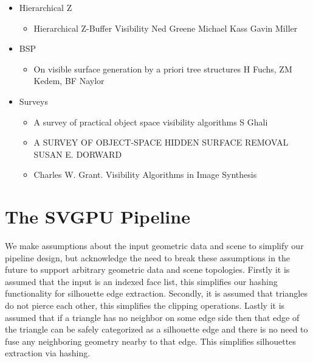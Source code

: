 \documentclass[review]{acmsiggraph}
\begin{document}
\begin{itemize}
\item Hierarchical Z
\begin{itemize}
\item Hierarchical Z-Buffer Visibility Ned Greene Michael Kass Gavin Miller
\end{itemize}
\item BSP
\begin{itemize}
\item On visible surface generation by a priori tree structures H Fuchs, ZM Kedem, BF Naylor
\end{itemize}
\item Surveys
\begin{itemize}
\item A survey of practical object space visibility algorithms  S Ghali
\item A SURVEY OF OBJECT-SPACE HIDDEN SURFACE REMOVAL SUSAN E. DORWARD
\item Charles W. Grant. Visibility Algorithms in Image Synthesis
\end{itemize}
\end{itemize}

\section{The SVGPU Pipeline}

We make assumptions about the input geometric data and scene to simplify our pipeline design, but acknowledge the need to break these assumptions in the future to support arbitrary geometric data and scene topologies. Firstly it is assumed that the input is an indexed face list, this simplifies our hashing functionality for silhouette edge extraction. Secondly, it is assumed that triangles do not pierce each other, this simplifies the clipping operations. Lastly it is assumed that if a triangle has no neighbor on some edge side then that edge of the triangle can be safely categorized as a silhouette edge and there is no need to fuse any neighboring geometry nearby to that edge. This simplifies silhouettes extraction via hashing.
\end{document}
